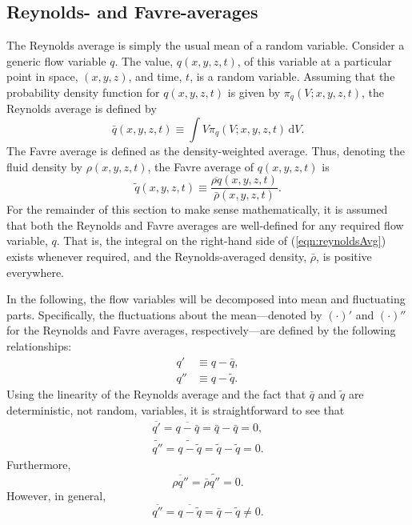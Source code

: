\documentclass[letterpaper,11pt,nointlimits,reqno]{amsart}
\begin{document}
\subsection{Reynolds- and Favre-averages}
\label{sec:averaging}

The Reynolds average is simply the usual mean of a random variable.  Consider a
generic flow variable $q$.  The value, $q(x, y, z, t)$, of this variable at a
particular point in space, $(x, y, z)$, and time, $t$, is a random variable.
Assuming that the probability density function for $q(x, y, z, t)$ is given by
$\pi_q(V; x, y, z, t)$, the Reynolds average is defined by
%
\begin{equation}
\label{eqn:reynoldsAvg}
\bar{q}(x, y, z, t) \equiv \int V \pi_q(V; x, y, z, t) \,\mathrm{d} V.
\end{equation}
%
The Favre average is defined as the density-weighted average.  Thus,
denoting the fluid density by $\rho(x,y,z, t)$, the Favre average of
$q(x,y,z, t)$ is
%
\begin{equation*}
\tilde{q}(x,y,z, t) \equiv \frac{ \overline{\rho q}(x,y,z, t) }{ \bar{\rho}(x,y,z, t) }.
\end{equation*}
%
For the remainder of this section to make sense mathematically, it is
assumed that both the Reynolds and Favre averages are well-defined for
any required flow variable, $q$.  That is, the integral on the
right-hand side of (\ref{eqn:reynoldsAvg}) exists whenever required,
and the Reynolds-averaged density, $\bar{\rho}$, is positive
everywhere.

In the following, the flow variables will be decomposed into mean and
fluctuating parts.  Specifically, the fluctuations about the
mean---denoted by $(\cdot)'$ and $(\cdot)''$ for the Reynolds and
Favre averages, respectively---are defined by the following
relationships:
%
\begin{align*}
q' &\equiv q - \bar{q}, \\
q'' &\equiv q - \tilde{q}.
\end{align*}
%
Using the linearity of the Reynolds average and the fact that
$\bar{q}$ and $\tilde{q}$ are deterministic, not random, variables, it
is straightforward to see that
%
\begin{gather*}
\overline{q'} = \overline{q - \bar{q}} = \bar{q} - \bar{q} =  0, \\
\widetilde{q''} = \widetilde{q - \tilde{q}} = \tilde{q} - \tilde{q} = 0.
\end{gather*}
%
Furthermore,
%
\begin{equation*}
\overline{\rho q''} = \bar{\rho} \widetilde{q''} = 0.
\end{equation*}
%
However, in general,
%
\begin{equation*}
\overline{q''} = \overline{q - \tilde{q}} = \bar{q} - \tilde{q} \neq 0.
\end{equation*}
%
\end{document}
